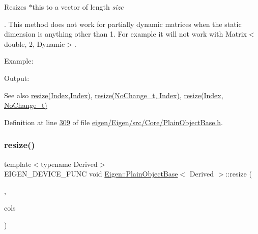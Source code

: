 Resizes {\ttfamily $\ast$this} to a vector of length {\itshape size} 

. This method does not work for partially dynamic matrices when the static dimension is anything other than 1. For example it will not work with Matrix$<$double, 2, Dynamic$>$.

Example\+: 
\begin{DoxyCodeInclude}
\end{DoxyCodeInclude}
 Output\+: 
\begin{DoxyVerbInclude}
\end{DoxyVerbInclude}


\begin{DoxySeeAlso}{See also}
\hyperlink{class_eigen_1_1_plain_object_base_a99d9054ee2d5a40c6e00ded0265e9cea}{resize(\+Index,\+Index)}, \hyperlink{class_eigen_1_1_plain_object_base_ab71a655f73d05a0e389e3ed13b6fe5f3}{resize(\+No\+Change\+\_\+t, Index)}, \hyperlink{class_eigen_1_1_plain_object_base_a7b44761b7350ae3756035bbf7d7c04f6}{resize(\+Index, No\+Change\+\_\+t)} 
\end{DoxySeeAlso}


Definition at line \hyperlink{eigen_2_eigen_2src_2_core_2_plain_object_base_8h_source_l00309}{309} of file \hyperlink{eigen_2_eigen_2src_2_core_2_plain_object_base_8h_source}{eigen/\+Eigen/src/\+Core/\+Plain\+Object\+Base.\+h}.

\mbox{\label{class_eigen_1_1_plain_object_base_ab71a655f73d05a0e389e3ed13b6fe5f3}} 
\subsubsection{\texorpdfstring{resize()}{resize()}\hspace{0.1cm}{\footnotesize\ttfamily [5/8]}}
{\footnotesize\ttfamily template$<$typename Derived$>$ \\
E\+I\+G\+E\+N\+\_\+\+D\+E\+V\+I\+C\+E\+\_\+\+F\+U\+NC void \hyperlink{class_eigen_1_1_plain_object_base}{Eigen\+::\+Plain\+Object\+Base}$<$ Derived $>$\+::resize (\begin{DoxyParamCaption}\item[{No\+Change\+\_\+t}]{,  }\item[{\hyperlink{namespace_eigen_a62e77e0933482dafde8fe197d9a2cfde}{Index}}]{cols }\end{DoxyParamCaption})\hspace{0.3cm}{\ttfamily [inline]}}

